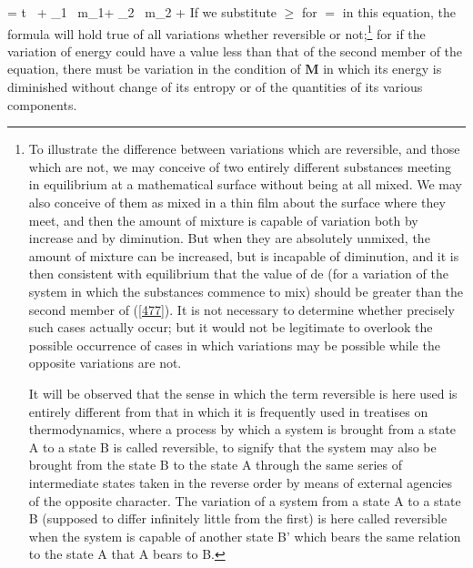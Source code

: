 \documentclass[12pt]{article}
\begin{document}
{\eqs \delta \epsilon = t \, \delta \eta + \mu_1 \, \delta m_1+ \mu_2 \, \delta m_2 +  \label{477} \eqe
If we substitute $\geq$ for $=$ in this equation, the formula will hold true of all variations whether reversible or not;\footnote{To illustrate the difference between variations which are reversible, and those which are not, we may conceive of two entirely different substances meeting in equilibrium at a mathematical surface without being at all mixed. We may also conceive of them as mixed in a thin film about the surface where they meet, and then the amount of mixture is capable of variation both by increase and by diminution. But when they are absolutely unmixed, the amount of mixture can be increased, but is incapable of diminution, and it is then consistent with equilibrium that the value of de (for a variation of the system in which the substances commence to mix) should be greater than the second member of (\ref{477}). It is not necessary to determine whether precisely such cases actually occur; but it would not be legitimate to overlook the possible occurrence of cases in which variations may be possible while the opposite variations are not.\par
It will be observed that the sense in which the term reversible is here used is entirely different from that in which it is frequently used in treatises on thermodynamics, where a process by which a system is brought from a state A to a state B is called reversible, to signify that the system may also be brought from the state B to the state A through the same series of intermediate states taken in the reverse order by means of external agencies of the opposite character. The variation of a system from a state A to a state B (supposed to differ infinitely little from the first) is here called reversible when the system is capable of another state B' which bears the same relation to the state A that A bears to B.} %
for if the variation of energy could have a value less than that of the second member of the equation, there must be variation in the condition of $\mathbf{M}$ in which its energy is diminished without change of its entropy or of the quantities of its various components.


}
\end{document}

